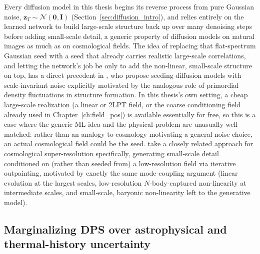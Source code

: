 Every diffusion model in this thesis begins its reverse process from pure Gaussian noise, $\bm{z}_T\sim\mathcal{N}(\bm 0,\bm I)$ (Section~\ref{sec:diffusion_intro}), and relies entirely on the learned network to build large-scale structure back up over many denoising steps before adding small-scale detail, a generic property of diffusion models on natural images as much as on cosmological fields. The idea of replacing that flat-spectrum Gaussian seed with a seed that already carries realistic large-scale correlations, and letting the network's job be only to add the non-linear, small-scale structure on top, has a direct precedent in \citet{randono_cloud_diffusion_2025}, who propose seeding diffusion models with scale-invariant noise explicitly motivated by the analogous role of primordial density fluctuations in structure formation. In this thesis's own setting, a cheap large-scale realization (a linear or 2LPT field, or the coarse conditioning field already used in Chapter~\ref{ch:field_pos}) is available essentially for free, so this is a case where the generic ML idea and the physical problem are unusually well matched: rather than an analogy to cosmology motivating a general noise choice, an actual cosmological field could be the seed. \citet{rouhiainen_superresolution_2024} take a closely related approach for cosmological super-resolution specifically, generating small-scale detail conditioned on (rather than seeded from) a low-resolution field via iterative outpainting, motivated by exactly the same mode-coupling argument (linear evolution at the largest scales, low-resolution $N$-body-captured non-linearity at intermediate scales, and small-scale, baryonic non-linearity left to the generative model).

\subsection{Marginalizing DPS over astrophysical and thermal-history uncertainty}
\label{sec:conclusion_future_astro}

